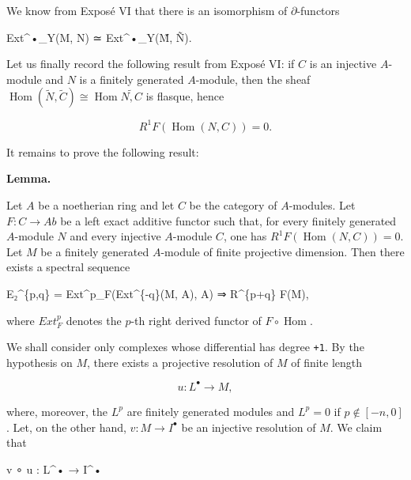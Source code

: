 \documentclass[
]{article}
\newenvironment{Shaded}{}{}
\newcommand{\NormalTok}[1]{#1}
\begin{document}
We know from Exposé VI that there is an isomorphism of
\(\partial\)-functors

\begin{Shaded}
\begin{Highlighting}[]
\NormalTok{Ext\^{}•\_Y(M, N) ≃ Ext\^{}•\_Y(M̃, Ñ).}
\end{Highlighting}
\end{Shaded}

Let us finally record the following result from Exposé VI: if \(C\) is
an injective \(A\)-module and \(N\) is a finitely generated
\(A\)-module, then the sheaf
\(\operatorname{Hom}(\tilde{N}, \tilde{C}) \cong \operatorname{Hom}\tilde{N, C}\)
is flasque, hence

\[
R^{1} F(\operatorname{Hom}(N, C)) = 0.
\]

It remains to prove the following result:

\textbf{Lemma.}

Let \(A\) be a noetherian ring and let \(C\) be the category of
\(A\)-modules. Let \(F : C \to Ab\) be a left exact additive functor
such that, for every finitely generated \(A\)-module \(N\) and every
injective \(A\)-module \(C\), one has
\(R^{1} F(\operatorname{Hom}(N, C)) = 0\). Let \(M\) be a finitely
generated \(A\)-module of finite projective dimension. Then there exists
a spectral sequence

\begin{Shaded}
\begin{Highlighting}[]
\NormalTok{E₂\^{}\{p,q\} = Ext\^{}p\_F(Ext\^{}\{{-}q\}(M, A), A) ⇒ R\^{}\{p+q\} F(M),}
\end{Highlighting}
\end{Shaded}

where \(Ext^{p}_{F}\) denotes the \(p\)-th right derived functor of
\(F \circ \operatorname{Hom}\).

We shall consider only complexes whose differential has degree
\texttt{+1}. By the hypothesis on \(M\), there exists a projective
resolution of \(M\) of finite length

\[
u : L^{\bullet} \to M,
\]

where, moreover, the \(L^{p}\) are finitely generated modules and
\(L^{p} = 0\) if \(p \notin [-n, 0]\). Let, on the other hand,
\(v : M \to I^{\bullet}\) be an injective resolution of \(M\). We claim
that

\begin{Shaded}
\begin{Highlighting}[]
\NormalTok{v ∘ u : L\^{}• → I\^{}•}
\end{Highlighting}
\end{Shaded}
\end{document}
